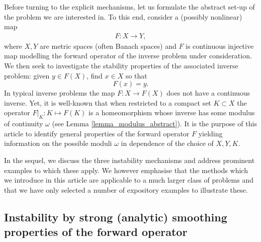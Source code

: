 \documentclass[12pt,twoside]{amsart}
\numberwithin{equation}{section}
\begin{document}
Before turning to the explicit mechanisms, let us formulate the abstract set-up of the problem we are interested in. To this end, consider a (possibly nonlinear) map 
\begin{align*}
F:X \rightarrow Y,
\end{align*}
where $X,Y$ are metric spaces (often Banach spaces) and $F$ is continuous injective map modelling the forward operator of the inverse problem under consideration. We then seek to investigate the stability properties of the associated inverse problem: given $y \in F(X)$, find $x \in X$ so that 
\[
F(x) = y.
\]
In typical inverse problems the map $F: X \to F(X)$ does not have a continuous inverse. Yet, it is well-known that when restricted to a compact set $K\subset X$ the operator $F|_{K}:K\mapsto F(K)$ is a homeomorphism whose inverse has some modulus of continuity $\omega$ (see Lemma \ref{lemma_modulus_abstract}). It is the purpose of this article to identify general properties of the forward operator $F$ yielding information on the possible moduli $\omega$ in dependence of the choice of $X,Y,K$.


In the sequel, we discuss the three instability mechanisms and address prominent examples to which these apply. We however emphasise that the methods which we introduce in this article are applicable to a much larger class of problems and that we have only selected a number of expository examples to illustrate these.


\subsection{Instability by strong (analytic) smoothing properties of the forward operator}

\label{sec:instI}
\end{document}
